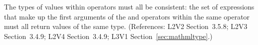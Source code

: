 The types of values within  operators must all
be consistent: the set of expressions that make up the first
arguments of the  and  operators
within the same  operator must all return
values of the same type.  (References: L2V2 Section~3.5.8; L2V3 
Section~3.4.9; L2V4 Section~3.4.9; L3V1 Section~\ref{sec:mathmltype}.)
